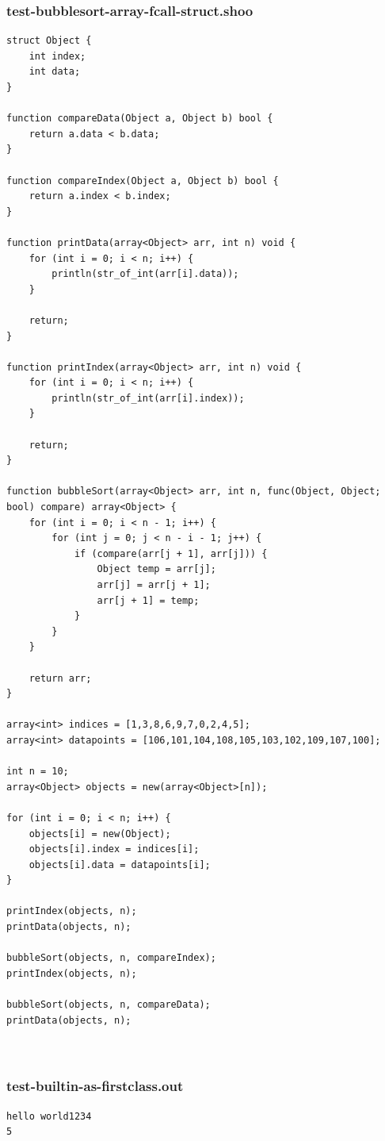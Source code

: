 \documentclass[12pt]{article}
\begin{document}
\subsubsection{test-bubblesort-array-fcall-struct.shoo}
\begin{mdframed}[hidealllines=true,backgroundcolor=blue!10]
\begin{lstlisting}
struct Object {
	int index;
	int data;
}

function compareData(Object a, Object b) bool {
    return a.data < b.data;
}

function compareIndex(Object a, Object b) bool {
    return a.index < b.index;
}

function printData(array<Object> arr, int n) void {
	for (int i = 0; i < n; i++) {
		println(str_of_int(arr[i].data));
	}
	
	return;
}

function printIndex(array<Object> arr, int n) void {
	for (int i = 0; i < n; i++) {
		println(str_of_int(arr[i].index));
	}
	
	return;
}

function bubbleSort(array<Object> arr, int n, func(Object, Object; bool) compare) array<Object> {
	for (int i = 0; i < n - 1; i++) {
		for (int j = 0; j < n - i - 1; j++) {
			if (compare(arr[j + 1], arr[j])) {
				Object temp = arr[j];
				arr[j] = arr[j + 1];
				arr[j + 1] = temp;
			}
		}
	}
	
	return arr;
}

array<int> indices = [1,3,8,6,9,7,0,2,4,5];
array<int> datapoints = [106,101,104,108,105,103,102,109,107,100];

int n = 10;
array<Object> objects = new(array<Object>[n]);

for (int i = 0; i < n; i++) {
	objects[i] = new(Object);
	objects[i].index = indices[i]; 
	objects[i].data = datapoints[i];
}

printIndex(objects, n);
printData(objects, n);

bubbleSort(objects, n, compareIndex);
printIndex(objects, n);

bubbleSort(objects, n, compareData);
printData(objects, n);



\end{lstlisting}
\end{mdframed}
\subsubsection{test-builtin-as-firstclass.out}
\begin{mdframed}[hidealllines=true,backgroundcolor=green!10]
\begin{lstlisting}
hello world1234
5
\end{lstlisting}
\end{mdframed}
\end{document}
